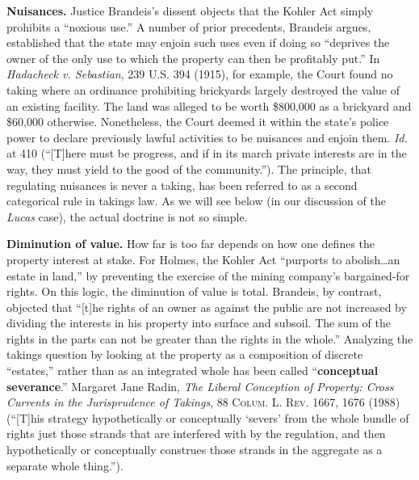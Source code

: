 
\item \textbf{Nuisances.} Justice Brandeis's dissent objects that the Kohler Act
simply prohibits a ``noxious use.'' A number of prior precedents, Brandeis
argues, established that the state may enjoin such uses even if doing so
``deprives the owner of the only use to which the property can then be
profitably put.'' In \textit{Hadacheck v. Sebastian}, 239 U.S. 394 (1915), for
example, the Court found no taking where an ordinance prohibiting brickyards
largely destroyed the value of an existing facility. The land was alleged to be
worth \$800,000 as a brickyard and \$60,000 otherwise. Nonetheless, the Court
deemed it within the state's police power to declare previously lawful
activities to be nuisances and enjoin them. \textit{Id.} at 410 (``[T]here must
be progress, and if in its march private interests are in the way, they must
yield to the good of the community.''). The principle, that regulating nuisances
is never a taking, has been referred to as a second categorical rule in takings
law. As we will see below (in our discussion of the \textit{Lucas} case), the
actual doctrine is not so simple.

\item \textbf{Diminution of value.} How far is too far depends on how one
defines the property interest at stake. For Holmes, the Kohler Act ``purports to
abolish\ldots an estate in land,'' by preventing the exercise of the mining
company's bargained-for rights. On this logic, the diminution of value is total.
Brandeis, by contrast, objected that ``[t]he rights of an owner as against the
public are not increased by dividing the interests in his property into surface
and subsoil. The sum of the rights in the parts can not be greater than the
rights in the whole.'' Analyzing the takings question by looking at the property
as a composition of discrete ``estates,'' rather than as an integrated whole has
been called ``\textbf{conceptual severance}.'' Margaret Jane Radin, \textit{The
Liberal Conception of Property: Cross Currents in the Jurisprudence of Takings},
88 \textsc{Colum. L. Rev}. 1667, 1676 (1988) (``[T]his strategy hypothetically
or conceptually `severs' from the whole bundle of rights just those strands
that are interfered with by the regulation, and then hypothetically or
conceptually construes those strands in the aggregate as a separate whole
thing.''). 


